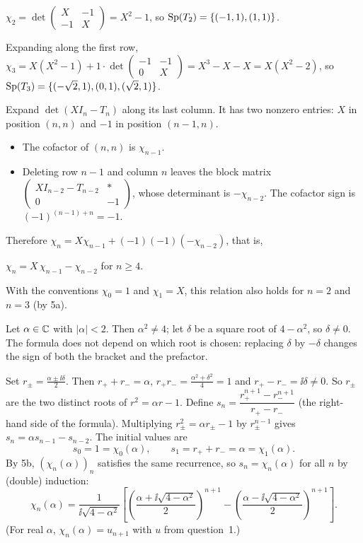 \documentclass[11pt,a4paper]{article}
\begin{document}

$\chi_2 = \det\begin{pmatrix} X & -1\\ -1 & X\end{pmatrix} = X^2 - 1$, so
$\operatorname{Sp}(T_2) = \{(-1,1), (1,1)\}$.

Expanding along the first row,
$\chi_3 = X(X^2-1) + 1\cdot\det\begin{pmatrix}-1&-1\\0&X\end{pmatrix}
        = X^3 - X - X = X(X^2-2)$, so $\operatorname{Sp}(T_3) = \{(-\sqrt2,1),(0,1),(\sqrt2,1)\}$.

Expand $\det(XI_n - T_n)$ along its last column. It has two nonzero entries: $X$ in position
$(n,n)$ and $-1$ in position $(n-1,n)$.
\begin{itemize}
\item The cofactor of $(n,n)$ is $\chi_{n-1}$.
\item Deleting row $n-1$ and column $n$ leaves the block matrix
  $\begin{pmatrix} XI_{n-2}-T_{n-2} & * \\ 0 & -1\end{pmatrix}$, whose determinant is
  $-\chi_{n-2}$. The cofactor sign is $(-1)^{(n-1)+n} = -1$.
\end{itemize}
Therefore $\chi_n = X\chi_{n-1} + (-1)(-1)(-\chi_{n-2})$, that is,
\begin{result}
$\chi_n = X\,\chi_{n-1} - \chi_{n-2}$ \quad for $n \ge 4$.
\end{result}
With the conventions $\chi_0 = 1$ and $\chi_1 = X$, this relation also holds for $n = 2$ and
$n = 3$ (by 5a).

Let $\alpha\in\mathbb{C}$ with $|\alpha| < 2$. Then $\alpha^2 \ne 4$; let $\delta$ be a square root of
$4 - \alpha^2$, so $\delta \ne 0$. The formula does not depend on which root is chosen:
replacing $\delta$ by $-\delta$ changes the sign of both the bracket and the prefactor.

Set $r_\pm = \frac{\alpha \pm \ii\delta}{2}$. Then $r_+ + r_- = \alpha$,
$r_+r_- = \frac{\alpha^2+\delta^2}{4} = 1$ and $r_+ - r_- = \ii\delta \ne 0$. So $r_\pm$ are
the two distinct roots of $r^2 = \alpha r - 1$. Define
$s_n = \dfrac{r_+^{n+1} - r_-^{n+1}}{r_+ - r_-}$ (the right-hand side of the formula).
Multiplying $r_\pm^2 = \alpha r_\pm - 1$ by $r_\pm^{n-1}$ gives
$s_n = \alpha s_{n-1} - s_{n-2}$. The initial values are
\[
  s_0 = 1 = \chi_0(\alpha), \qquad s_1 = r_+ + r_- = \alpha = \chi_1(\alpha).
\]
By 5b, $(\chi_n(\alpha))_n$ satisfies the same recurrence, so $s_n = \chi_n(\alpha)$ for all $n$
by (double) induction:
\[
  \chi_n(\alpha) = \frac{1}{\ii\sqrt{4-\alpha^2}}\left[\left(\frac{\alpha+\ii\sqrt{4-\alpha^2}}{2}\right)^{n+1}
    - \left(\frac{\alpha-\ii\sqrt{4-\alpha^2}}{2}\right)^{n+1}\right].
\]
(For real $\alpha$, $\chi_n(\alpha) = u_{n+1}$ with $u$ from question~1.)
\end{document}
